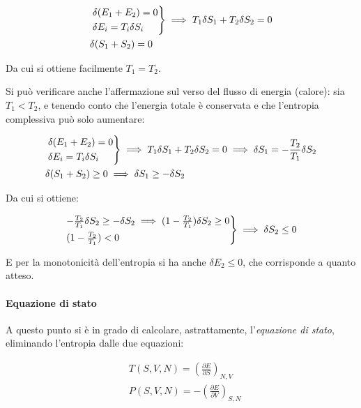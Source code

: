 \begin{align*}
&\begin{rcases*}
\delta(E_1 + E_2) = 0 \\
\delta E_i = T_i \delta S_i
\end{rcases*}
\implies T_1 \delta S_1 + T_2 \delta S_2 = 0 \\
&\delta(S_1 + S_2) = 0
\end{align*}

\noindent Da cui si ottiene facilmente $T_1 = T_2$.

Si può verificare anche l'affermazione sul verso del flusso di energia (calore): sia $T_1 < T_2$,  e tenendo conto che l'energia totale è conservata e che l'entropia complessiva può solo aumentare:

\begin{align*}
&\begin{rcases*}
\delta(E_1 + E_2) = 0 \\
\delta E_i = T_i \delta S_i
\end{rcases*}
\implies T_1 \delta S_1 + T_2 \delta S_2 = 0 \implies \delta S_1 = - \frac{T_2}{T_1} \delta S_2\\
& \delta(S_1 + S_2) \geq 0 \implies \delta S_1 \geq - \delta S_2
\end{align*}

Da cui si ottiene:

\begin{equation*}
\begin{rcases*}
- \frac{T_2}{T_1} \delta S_2 \geq - \delta S_2 \implies (1 - \frac{T_2}{T_1}) \delta S_2 \geq 0 \\
(1 - \frac{T_2}{T_1}) < 0
\end{rcases*}
\implies \delta S_2 \leq 0
\end{equation*}

E per la monotonicità dell'entropia si ha anche $\delta E_2 \leq 0$, che corrisponde a quanto atteso.

\paragraph{Equazione di stato} A questo punto si è in grado di calcolare, astrattamente, l'\textit{equazione di stato}, eliminando l'entropia dalle due equazioni:

\begin{align*}
	&T(S,V,N) = \left(\frac{\partial E}{\partial S}\right)_{N,V} \\
	&P(S,V,N) = - \left(\frac{\partial E}{\partial V}\right)_{S,N}
\end{align*}

